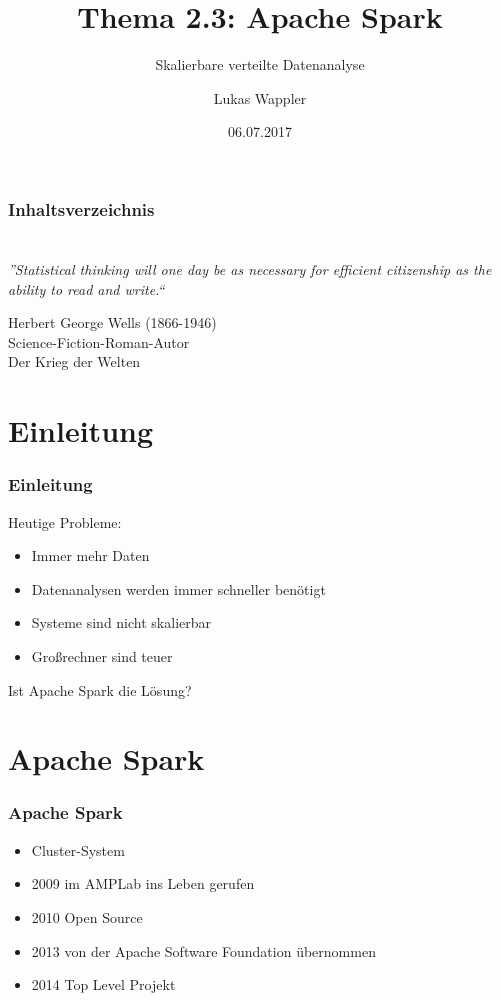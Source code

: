 \documentclass[hyperref={pdfpagelabels=false}]{beamer}
\title{Thema 2.3: Apache Spark}
\subtitle{Skalierbare verteilte Datenanalyse}
\author{Lukas Wappler}
\date{06.07.2017}
\begin{document}
\begin{frame}
\titlepage
\end{frame} 


\begin{frame}
\frametitle{Inhaltsverzeichnis}
\setcounter{tocdepth}{1}
\tableofcontents
\end{frame} 





\section{} 
\begin{frame}
\frametitle{} 
\begin{center}
\textit{\LARGE{”Statistical thinking will one day be as necessary for efficient citizenship as the ability to read and write.“}}
\end{center}
\vspace{0.5cm} 
\begin{flushright}
\footnotesize{Herbert George Wells (1866-1946)\\ Science-Fiction-Roman-Autor\\ Der Krieg der Welten}
\end{flushright}

\end{frame}


\section*{Einleitung} 
\begin{frame}[t]
\frametitle{Einleitung} 

Heutige Probleme:
\begin{itemize}
\item  Immer mehr Daten 
\item  Datenanalysen werden immer schneller benötigt
\item  Systeme sind nicht skalierbar
\item  Großrechner sind teuer
\end{itemize}  


 { \huge{Ist Apache Spark die Lösung?}  }

\end{frame}

\section{Apache Spark} 
\begin{frame} [t]
\frametitle{Apache Spark} 


\begin{itemize}
	\item Cluster-System
	\item 2009 im AMPLab ins Leben gerufen
	\item 2010 Open Source	
	\item 2013 von der Apache Software Foundation übernommen
	\item 2014 Top Level Projekt		
\end{itemize}

\end{frame}
\end{document}

